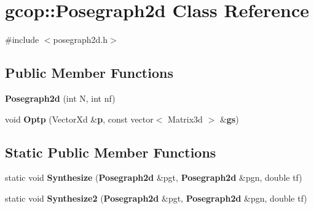 \section{gcop\-:\-:\-Posegraph2d \-Class \-Reference}
\label{classgcop_1_1Posegraph2d}


{\ttfamily \#include $<$posegraph2d.\-h$>$}

\subsection*{\-Public \-Member \-Functions}
\begin{DoxyCompactItemize}
\item 
{\bf \-Posegraph2d} (int \-N, int nf)
\item 
void {\bf \-Optp} (\-Vector\-Xd \&{\bf p}, const vector$<$ \-Matrix3d $>$ \&{\bf gs})
\end{DoxyCompactItemize}
\subsection*{\-Static \-Public \-Member \-Functions}
\begin{DoxyCompactItemize}
\item 
static void {\bf \-Synthesize} ({\bf \-Posegraph2d} \&pgt, {\bf \-Posegraph2d} \&pgn, double tf)
\item 
static void {\bf \-Synthesize2} ({\bf \-Posegraph2d} \&pgt, {\bf \-Posegraph2d} \&pgn, double tf)
\end{DoxyCompactItemize}
